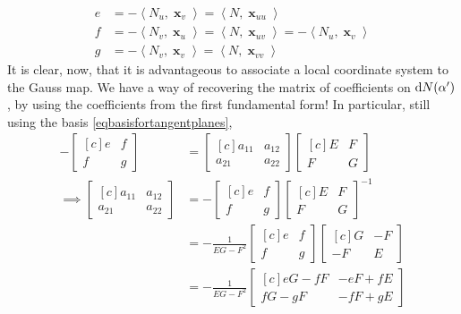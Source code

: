 \documentclass{amsart} %
\theoremstyle{mytheoremstyle}
\theoremstyle{definition}
\numberwithin{equation}{section}
\DeclareMathOperator{\1}{\mathbbm{1}}
\DeclareMathOperator{\D}{\dif}
\DeclareMathOperator{\x}{\mathbf{x}}
\newcommand{\innerproduct}[2]{\left\langle #1,#2 \right\rangle}
\begin{document}
\begin{align*}
	e &= - \innerproduct{N_u}{\x_v} = \innerproduct{N}{\x_{uu}} \\
	f &= - \innerproduct{N_v}{\x_u} = \innerproduct{N}{\x_{uv}} = - \innerproduct{N_u}{\x_v} \\
	g &= - \innerproduct{N_v}{\x_v} = \innerproduct{N}{\x_{vv}}
\end{align*}
It is clear, now, that it is advantageous to associate a local coordinate system to the Gauss map. We have a way of recovering the matrix of coefficients on $\D N(\alpha')$, by using the coefficients from the first fundamental form! In particular, still using the basis \eqref{eqbasisfortangentplanes},
\begin{align}
\label{eqcoordinatesrelation}
- \begin{bmatrix*}[c]
e & f \\ f & g 
\end{bmatrix*} & = \begin{bmatrix*}[c]
a_{11} & a_{12} \\ a_{21} & a_{22}
\end{bmatrix*} \begin{bmatrix*}[c]
E & F \\ F & G 
\end{bmatrix*}  \\
%
\nonumber \implies \begin{bmatrix*}[c]
a_{11} & a_{12} \\ a_{21} & a_{22}
\end{bmatrix*} &= - \begin{bmatrix*}[c]
e & f \\ f & g 
\end{bmatrix*} \begin{bmatrix*}[c]
E & F \\ F & G 
\end{bmatrix*}^{-1}  \\
%
\nonumber  &= - \frac{1}{EG - F^2} \begin{bmatrix*}[c]
e & f \\ f & g 
\end{bmatrix*} \begin{bmatrix*}[c]
G & -F \\ -F & E 
\end{bmatrix*} \\
%
\nonumber  &= - \frac{1}{EG - F^2} \begin{bmatrix*}[c]
eG - fF & -eF + fE \\ fG - gF & -fF + gE 
\end{bmatrix*} 
\end{align}
\end{document}
